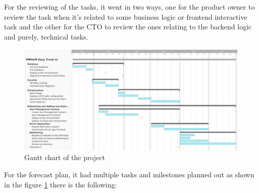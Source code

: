 For the reviewing of the tasks, it went in two ways, one for the product owner to
review the task when it's related to some business logic or frontend interactive task
and the other for the CTO to review the ones relating to the backend logic and purely,
technical tasks.

\begin{figure}
    \centering
    \includegraphics[width=\textwidth]{images/Plan.jpeg}
    \caption{\footnotesize{Gantt chart of the project}}
    \label{fig:gantt_chart}
\end{figure}

For the forecast plan, it had multiple tasks and milestones planned out as shown in the
\newline figure \ref{fig:gantt_chart} there is the following:

